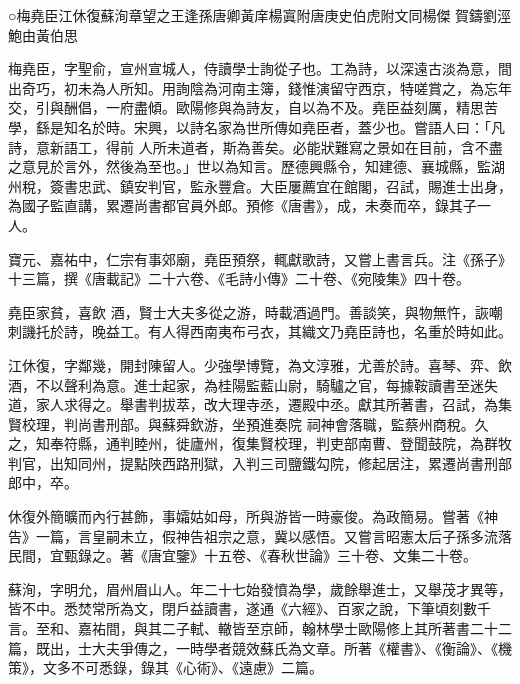 
\begin{pinyinscope}

 ○梅堯臣江休復蘇洵章望之王逢孫唐卿黃庠楊寘附唐庚史伯虎附文同楊傑
 賀鑄劉涇鮑由黃伯思



 梅堯臣，字聖俞，宣州宣城人，侍讀學士詢從子也。工為詩，以深遠古淡為意，間出奇巧，初未為人所知。用詢陰為河南主簿，錢惟演留守西京，特嗟賞之，為忘年交，引與酬倡，一府盡傾。歐陽修與為詩友，自以為不及。堯臣益刻厲，精思苦學，繇是知名於時。宋興，以詩名家為世所傳如堯臣者，蓋少也。嘗語人曰：「凡詩，意新語工，得前
 人所未道者，斯為善矣。必能狀難寫之景如在目前，含不盡之意見於言外，然後為至也。」世以為知言。歷德興縣令，知建德、襄城縣，監湖州稅，簽書忠武、鎮安判官，監永豐倉。大臣屢薦宜在館閣，召試，賜進士出身，為國子監直講，累遷尚書都官員外郎。預修《唐書》，成，未奏而卒，錄其子一人。



 寶元、嘉祐中，仁宗有事郊廟，堯臣預祭，輒獻歌詩，又嘗上書言兵。注《孫子》十三篇，撰《唐載記》二十六卷、《毛詩小傳》二十卷、《宛陵集》四十卷。



 堯臣家貧，喜飲
 酒，賢士大夫多從之游，時載酒過門。善談笑，與物無忤，詼嘲刺譏托於詩，晚益工。有人得西南夷布弓衣，其織文乃堯臣詩也，名重於時如此。



 江休復，字鄰幾，開封陳留人。少強學博覽，為文淳雅，尤善於詩。喜琴、弈、飲酒，不以聲利為意。進士起家，為桂陽監藍山尉，騎驢之官，每據鞍讀書至迷失道，家人求得之。舉書判拔萃，改大理寺丞，遷殿中丞。獻其所著書，召試，為集賢校理，判尚書刑部。與蘇舜欽游，坐預進奏院
 祠神會落職，監蔡州商稅。久之，知奉符縣，通判睦州，徙廬州，復集賢校理，判吏部南曹、登聞鼓院，為群牧判官，出知同州，提點陜西路刑獄，入判三司鹽鐵勾院，修起居注，累遷尚書刑部郎中，卒。



 休復外簡曠而內行甚飾，事孀姑如母，所與游皆一時豪俊。為政簡易。嘗著《神告》一篇，言皇嗣未立，假神告祖宗之意，冀以感悟。又嘗言昭憲太后子孫多流落民間，宜甄錄之。著《唐宜鑒》十五卷、《春秋世論》三十卷、文集二十卷。



 蘇洵，字明允，眉州眉山人。年二十七始發憤為學，歲餘舉進士，又舉茂才異等，皆不中。悉焚常所為文，閉戶益讀書，遂通《六經》、百家之說，下筆頃刻數千言。至和、嘉祐間，與其二子軾、轍皆至京師，翰林學士歐陽修上其所著書二十二篇，既出，士大夫爭傳之，一時學者競效蘇氏為文章。所著《權書》、《衡論》、《機策》，文多不可悉錄，錄其《心術》、《遠慮》二篇。




\end{pinyinscope}

